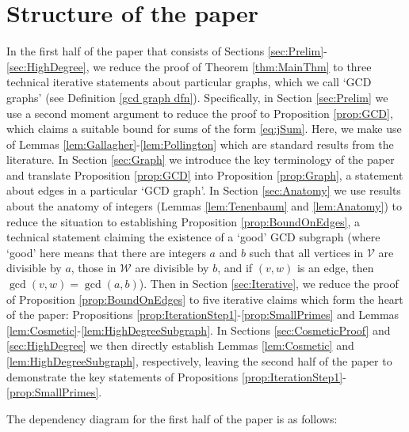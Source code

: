\documentclass[12pt]{amsart}
\numberwithin{equation}{section}
\theoremstyle{definition}
\theoremstyle{remark}
\newcommand{\CV}{\mathcal{V}}
\newcommand{\CW}{\mathcal{W}}
\begin{document}
\section{Structure of the paper}\label{sec:structure}
In the first half of the paper that consists of Sections \ref{sec:Prelim}-\ref{sec:HighDegree}, we reduce the proof of Theorem \ref{thm:MainThm} to three technical iterative statements about particular graphs, which we call `GCD graphs' (see Definition \ref{gcd graph dfn}). Specifically, in Section \ref{sec:Prelim} we use a second moment argument to reduce the proof to Proposition \ref{prop:GCD}, which claims a suitable bound for sums of the form \eqref{eq:jSum}. Here, we make use of Lemmas \ref{lem:Gallagher}-\ref{lem:Pollington} which are standard results from the literature. In Section \ref{sec:Graph} we introduce the key terminology of the paper and translate Proposition \ref{prop:GCD} into Proposition \ref{prop:Graph}, a statement about edges in a particular `GCD graph'. In Section \ref{sec:Anatomy} we use results about the anatomy of integers (Lemmas \ref{lem:Tenenbaum} and \ref{lem:Anatomy}) to reduce the situation to establishing Proposition \ref{prop:BoundOnEdges}, a technical statement claiming the existence of a `good' GCD subgraph (where `good' here means that there are integers $a$ and $b$ such that all vertices in $\CV$ are divisible by $a$, those in $\CW$ are divisible by $b$, and if $(v,w)$ is an edge, then $\gcd(v,w)=\gcd(a,b)$). Then in Section \ref{sec:Iterative}, we reduce the proof of Proposition \ref{prop:BoundOnEdges} to five iterative claims which form the heart of the paper:  Propositions \ref{prop:IterationStep1}-\ref{prop:SmallPrimes} and Lemmas \ref{lem:Cosmetic}-\ref{lem:HighDegreeSubgraph}. In Sections \ref{sec:CosmeticProof} and \ref{sec:HighDegree} we then directly establish Lemmas \ref{lem:Cosmetic} and \ref{lem:HighDegreeSubgraph}, respectively, leaving the second half of the paper to demonstrate the key statements of Propositions \ref{prop:IterationStep1}-\ref{prop:SmallPrimes}.

The dependency diagram for the first half of the paper is as follows:

\smallskip
\end{document}
